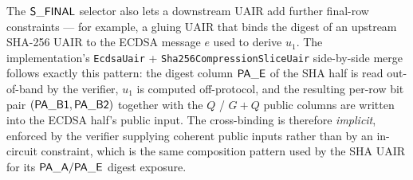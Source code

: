 The $\mathsf{S\_FINAL}$ selector also lets a downstream UAIR add
further final-row constraints — for example, a gluing UAIR that
binds the digest of an upstream SHA-256 UAIR to the ECDSA message
$e$ used to derive $u_1$. The implementation's
\texttt{EcdsaUair} + \texttt{Sha256CompressionSliceUair} side-by-side
merge follows exactly this pattern: the digest column
$\mathsf{PA\_E}$ of the SHA half is read out-of-band by the verifier,
$u_1$ is computed off-protocol, and the resulting per-row
bit pair $(\mathsf{PA\_B1}, \mathsf{PA\_B2})$ together with the
$Q$ / $G+Q$ public columns are written into the ECDSA half's
public input. The cross-binding is therefore \emph{implicit},
enforced by the verifier supplying coherent public inputs rather
than by an in-circuit constraint, which is the same composition
pattern used by the SHA UAIR for its $\mathsf{PA\_A}/\mathsf{PA\_E}$
digest exposure.
